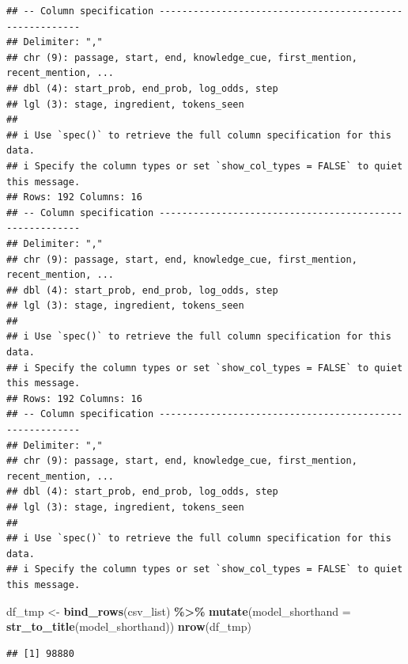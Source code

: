 \documentclass[
]{article}
\newenvironment{Shaded}{\begin{snugshade}}{\end{snugshade}}
\newcommand{\AttributeTok}[1]{\textcolor[rgb]{0.13,0.29,0.53}{#1}}
\newcommand{\FunctionTok}[1]{\textcolor[rgb]{0.13,0.29,0.53}{\textbf{#1}}}
\newcommand{\NormalTok}[1]{#1}
\newcommand{\OtherTok}[1]{\textcolor[rgb]{0.56,0.35,0.01}{#1}}
\newcommand{\SpecialCharTok}[1]{\textcolor[rgb]{0.81,0.36,0.00}{\textbf{#1}}}
\begin{document}
\begin{verbatim}
## -- Column specification --------------------------------------------------------
## Delimiter: ","
## chr (9): passage, start, end, knowledge_cue, first_mention, recent_mention, ...
## dbl (4): start_prob, end_prob, log_odds, step
## lgl (3): stage, ingredient, tokens_seen
## 
## i Use `spec()` to retrieve the full column specification for this data.
## i Specify the column types or set `show_col_types = FALSE` to quiet this message.
## Rows: 192 Columns: 16
## -- Column specification --------------------------------------------------------
## Delimiter: ","
## chr (9): passage, start, end, knowledge_cue, first_mention, recent_mention, ...
## dbl (4): start_prob, end_prob, log_odds, step
## lgl (3): stage, ingredient, tokens_seen
## 
## i Use `spec()` to retrieve the full column specification for this data.
## i Specify the column types or set `show_col_types = FALSE` to quiet this message.
## Rows: 192 Columns: 16
## -- Column specification --------------------------------------------------------
## Delimiter: ","
## chr (9): passage, start, end, knowledge_cue, first_mention, recent_mention, ...
## dbl (4): start_prob, end_prob, log_odds, step
## lgl (3): stage, ingredient, tokens_seen
## 
## i Use `spec()` to retrieve the full column specification for this data.
## i Specify the column types or set `show_col_types = FALSE` to quiet this message.
\end{verbatim}

\begin{Shaded}
\begin{Highlighting}[]
\NormalTok{df\_tmp }\OtherTok{\textless{}{-}} \FunctionTok{bind\_rows}\NormalTok{(csv\_list) }\SpecialCharTok{\%\textgreater{}\%}
  \FunctionTok{mutate}\NormalTok{(}\AttributeTok{model\_shorthand =} \FunctionTok{str\_to\_title}\NormalTok{(model\_shorthand))}
\FunctionTok{nrow}\NormalTok{(df\_tmp)}
\end{Highlighting}
\end{Shaded}

\begin{verbatim}
## [1] 98880
\end{verbatim}
\end{document}
